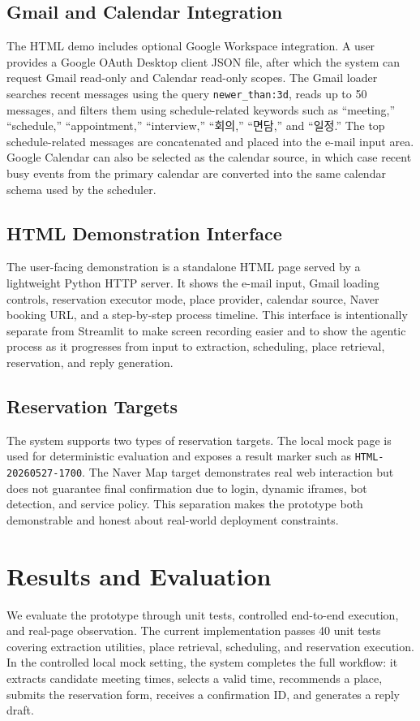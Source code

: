 \documentclass[sigconf,nonacm]{acmart}
\begin{document}
\subsection{Gmail and Calendar Integration}
The HTML demo includes optional Google Workspace integration. A user provides a Google OAuth Desktop client JSON file, after which the system can request Gmail read-only and Calendar read-only scopes. The Gmail loader searches recent messages using the query \texttt{newer\_than:3d}, reads up to 50 messages, and filters them using schedule-related keywords such as ``meeting,'' ``schedule,'' ``appointment,'' ``interview,'' ``회의,'' ``면담,'' and ``일정.'' The top schedule-related messages are concatenated and placed into the e-mail input area. Google Calendar can also be selected as the calendar source, in which case recent busy events from the primary calendar are converted into the same calendar schema used by the scheduler.

\subsection{HTML Demonstration Interface}
The user-facing demonstration is a standalone HTML page served by a lightweight Python HTTP server. It shows the e-mail input, Gmail loading controls, reservation executor mode, place provider, calendar source, Naver booking URL, and a step-by-step process timeline. This interface is intentionally separate from Streamlit to make screen recording easier and to show the agentic process as it progresses from input to extraction, scheduling, place retrieval, reservation, and reply generation.

\subsection{Reservation Targets}
The system supports two types of reservation targets. The local mock page is used for deterministic evaluation and exposes a result marker such as \texttt{HTML-20260527-1700}. The Naver Map target demonstrates real web interaction but does not guarantee final confirmation due to login, dynamic iframes, bot detection, and service policy. This separation makes the prototype both demonstrable and honest about real-world deployment constraints.

\section{Results and Evaluation}
We evaluate the prototype through unit tests, controlled end-to-end execution, and real-page observation. The current implementation passes 40 unit tests covering extraction utilities, place retrieval, scheduling, and reservation execution. In the controlled local mock setting, the system completes the full workflow: it extracts candidate meeting times, selects a valid time, recommends a place, submits the reservation form, receives a confirmation ID, and generates a reply draft.
\end{document}
